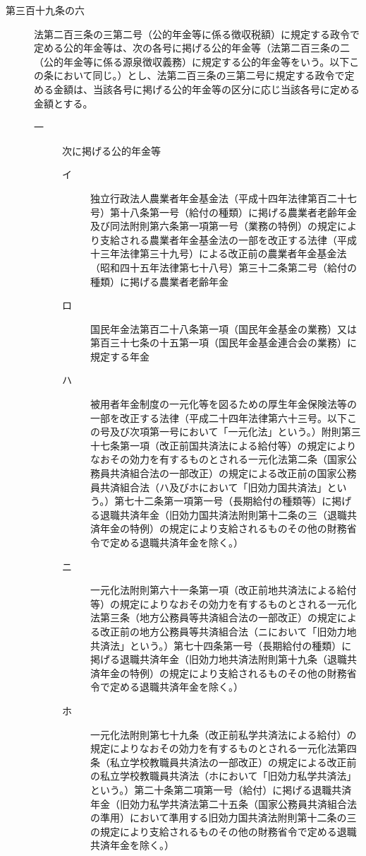 \documentclass[twocolumn,a4j,10pt]{ltjtarticle}
\begin{document}
\begin{description}
\item[第三百十九条の六]法第二百三条の三第二号（公的年金等に係る徴収税額）に規定する政令で定める公的年金等は、次の各号に掲げる公的年金等（法第二百三条の二（公的年金等に係る源泉徴収義務）に規定する公的年金等をいう。以下この条において同じ。）とし、法第二百三条の三第二号に規定する政令で定める金額は、当該各号に掲げる公的年金等の区分に応じ当該各号に定める金額とする。
\begin{description}
\item[一]次に掲げる公的年金等
\begin{description}
\item[イ]独立行政法人農業者年金基金法（平成十四年法律第百二十七号）第十八条第一号（給付の種類）に掲げる農業者老齢年金及び同法附則第六条第一項第一号（業務の特例）の規定により支給される農業者年金基金法の一部を改正する法律（平成十三年法律第三十九号）による改正前の農業者年金基金法（昭和四十五年法律第七十八号）第三十二条第二号（給付の種類）に掲げる農業者老齢年金
\item[ロ]国民年金法第百二十八条第一項（国民年金基金の業務）又は第百三十七条の十五第一項（国民年金基金連合会の業務）に規定する年金
\item[ハ]被用者年金制度の一元化等を図るための厚生年金保険法等の一部を改正する法律（平成二十四年法律第六十三号。以下この号及び次項第一号において「一元化法」という。）附則第三十七条第一項（改正前国共済法による給付等）の規定によりなおその効力を有するものとされる一元化法第二条（国家公務員共済組合法の一部改正）の規定による改正前の国家公務員共済組合法（ハ及びホにおいて「旧効力国共済法」という。）第七十二条第一項第一号（長期給付の種類等）に掲げる退職共済年金（旧効力国共済法附則第十二条の三（退職共済年金の特例）の規定により支給されるものその他の財務省令で定める退職共済年金を除く。）
\item[ニ]一元化法附則第六十一条第一項（改正前地共済法による給付等）の規定によりなおその効力を有するものとされる一元化法第三条（地方公務員等共済組合法の一部改正）の規定による改正前の地方公務員等共済組合法（ニにおいて「旧効力地共済法」という。）第七十四条第一号（長期給付の種類）に掲げる退職共済年金（旧効力地共済法附則第十九条（退職共済年金の特例）の規定により支給されるものその他の財務省令で定める退職共済年金を除く。）
\item[ホ]一元化法附則第七十九条（改正前私学共済法による給付）の規定によりなおその効力を有するものとされる一元化法第四条（私立学校教職員共済法の一部改正）の規定による改正前の私立学校教職員共済法（ホにおいて「旧効力私学共済法」という。）第二十条第二項第一号（給付）に掲げる退職共済年金（旧効力私学共済法第二十五条（国家公務員共済組合法の準用）において準用する旧効力国共済法附則第十二条の三の規定により支給されるものその他の財務省令で定める退職共済年金を除く。）

\end{description}
\end{description}
\end{description}
\end{document}
